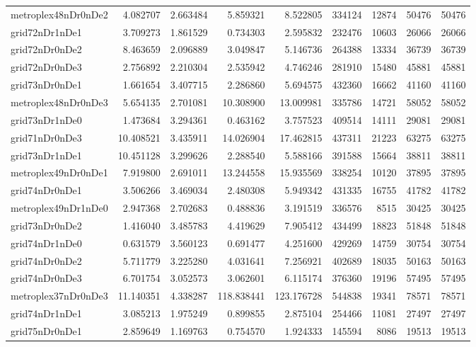 \begin{longtable}{|l|r|r|r|r|r|r|r|r|}
metroplex48nDr0nDe2 & 4.082707 & 2.663484 & 5.859321 & 8.522805 & 334124 & 12874 & 50476 & 50476 \\
grid72nDr1nDe1 & 3.709273 & 1.861529 & 0.734303 & 2.595832 & 232476 & 10603 & 26066 & 26066 \\
grid72nDr0nDe2 & 8.463659 & 2.096889 & 3.049847 & 5.146736 & 264388 & 13334 & 36739 & 36739 \\
grid72nDr0nDe3 & 2.756892 & 2.210304 & 2.535942 & 4.746246 & 281910 & 15480 & 45881 & 45881 \\
grid73nDr0nDe1 & 1.661654 & 3.407715 & 2.286860 & 5.694575 & 432360 & 16662 & 41160 & 41160 \\
metroplex48nDr0nDe3 & 5.654135 & 2.701081 & 10.308900 & 13.009981 & 335786 & 14721 & 58052 & 58052 \\
grid73nDr1nDe0 & 1.473684 & 3.294361 & 0.463162 & 3.757523 & 409514 & 14111 & 29081 & 29081 \\
grid71nDr0nDe3 & 10.408521 & 3.435911 & 14.026904 & 17.462815 & 437311 & 21223 & 63275 & 63275 \\
grid73nDr1nDe1 & 10.451128 & 3.299626 & 2.288540 & 5.588166 & 391588 & 15664 & 38811 & 38811 \\
metroplex49nDr0nDe1 & 7.919800 & 2.691011 & 13.244558 & 15.935569 & 338254 & 10120 & 37895 & 37895 \\
grid74nDr0nDe1 & 3.506266 & 3.469034 & 2.480308 & 5.949342 & 431335 & 16755 & 41782 & 41782 \\
metroplex49nDr1nDe0 & 2.947368 & 2.702683 & 0.488836 & 3.191519 & 336576 & 8515 & 30425 & 30425 \\
grid73nDr0nDe2 & 1.416040 & 3.485783 & 4.419629 & 7.905412 & 434499 & 18823 & 51848 & 51848 \\
grid74nDr1nDe0 & 0.631579 & 3.560123 & 0.691477 & 4.251600 & 429269 & 14759 & 30754 & 30754 \\
grid74nDr0nDe2 & 5.711779 & 3.225280 & 4.031641 & 7.256921 & 402689 & 18035 & 50163 & 50163 \\
grid74nDr0nDe3 & 6.701754 & 3.052573 & 3.062601 & 6.115174 & 376360 & 19196 & 57495 & 57495 \\
metroplex37nDr0nDe3 & 11.140351 & 4.338287 & 118.838441 & 123.176728 & 544838 & 19341 & 78571 & 78571 \\
grid74nDr1nDe1 & 3.085213 & 1.975249 & 0.899855 & 2.875104 & 254466 & 11081 & 27497 & 27497 \\
grid75nDr0nDe1 & 2.859649 & 1.169763 & 0.754570 & 1.924333 & 145594 & 8086 & 19513 & 19513 \\

\end{longtable}
